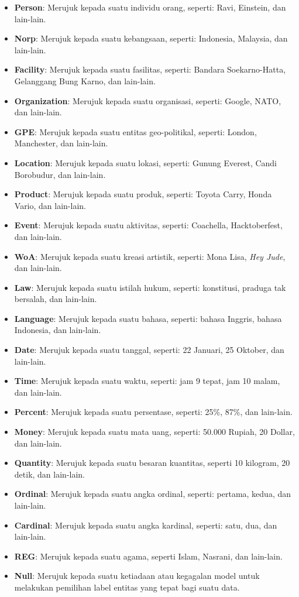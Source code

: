 \begin{itemize}
    
    \item \textbf{Person}: Merujuk kepada suatu individu orang, seperti: Ravi, Einstein, dan lain-lain.
    \item \textbf{Norp}: Merujuk kepada suatu kebangsaan, seperti: Indonesia, Malaysia, dan lain-lain.
    \item \textbf{Facility}: Merujuk kepada suatu fasilitas, seperti: Bandara Soekarno-Hatta, Gelanggang Bung Karno, dan lain-lain.
    \item \textbf{Organization}: Merujuk kepada suatu organisasi, seperti: Google, NATO, dan lain-lain.
    \item \textbf{GPE}: Merujuk kepada suatu entitas geo-politikal, seperti: London, Manchester, dan lain-lain.

    \item \textbf{Location}: Merujuk kepada suatu lokasi, seperti: Gunung Everest, Candi Borobudur, dan lain-lain.
    \item \textbf{Product}: Merujuk kepada suatu produk, seperti: Toyota Carry, Honda Vario, dan lain-lain.
    \item \textbf{Event}: Merujuk kepada suatu aktivitas, seperti: Coachella, Hacktoberfest, dan lain-lain.
    \item \textbf{WoA}: Merujuk kepada suatu kreasi artistik, seperti: Mona Lisa, \emph{Hey Jude}, dan lain-lain.
    \item \textbf{Law}: Merujuk kepada suatu istilah hukum, seperti: konstitusi, praduga tak bersalah, dan lain-lain.

    \item \textbf{Language}: Merujuk kepada suatu bahasa, seperti: bahasa Inggris, bahasa Indonesia, dan lain-lain.
    \item \textbf{Date}: Merujuk kepada suatu tanggal, seperti: 22 Januari, 25 Oktober, dan lain-lain.
    \item \textbf{Time}: Merujuk kepada suatu waktu, seperti: jam 9 tepat, jam 10 malam, dan lain-lain.
    \item \textbf{Percent}: Merujuk kepada suatu persentase, seperti: 25\%, 87\%, dan lain-lain. 
    \item \textbf{Money}: Merujuk kepada suatu mata uang, seperti: 50.000 Rupiah, 20 Dollar, dan lain-lain.

    \item \textbf{Quantity}: Merujuk kepada suatu besaran kuantitas, seperti 10 kilogram, 20 detik, dan lain-lain.
    \item \textbf{Ordinal}: Merujuk kepada suatu angka ordinal, seperti: pertama, kedua, dan lain-lain.
    \item \textbf{Cardinal}: Merujuk kepada suatu angka kardinal, seperti: satu, dua, dan lain-lain.
    \item \textbf{REG}: Merujuk kepada suatu agama, seperti Islam, Nasrani, dan lain-lain.
    \item \textbf{Null}: Merujuk kepada suatu ketiadaan atau kegagalan model untuk melakukan pemilihan label entitas yang tepat bagi suatu data.

\end{itemize}

